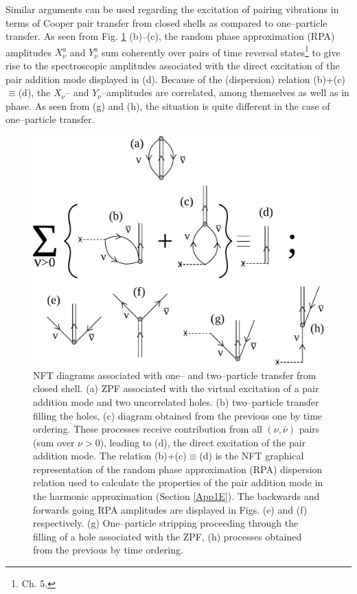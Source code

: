 Similar arguments can be used regarding the excitation of pairing vibrations in terms of Cooper pair transfer from closed shells as compared to one--particle transfer. As seen from Fig. \ref{fig2.1.5} (b)--(c), the random phase approximation (RPA) amplitudes $X_\nu^a$ and $Y^a_\nu$ sum coherently over pairs of time reversal states\footnote{\cite{Brink:05} Ch. 5.} to give rise to the spectroscopic amplitudes associated with the direct excitation of the pair addition mode displayed in (d). Because of the (dispersion) relation (b)+(c)$\equiv$(d), the $X_\nu$-- and $Y_\nu$--amplitudes are correlated, among themselves as well as in phase. As seen from (g) and (h), the situation is quite different in the case of one--particle transfer. 
\begin{figure}[h!]
\centerline {
\includegraphics*[width=12cm]{nutshell/figs/fig2_1_5}
}
\caption{NFT diagrams associated with one-- and two--particle transfer from closed shell. (a) ZPF associated with the virtual excitation of a pair addition mode and two uncorrelated holes. (b) two--particle transfer filling the holes, (c) diagram obtained from the previous one by time ordering. These processes receive contribution from all $(\nu,\bar\nu)$ pairs (sum over $\nu>0$), leading to (d), the direct excitation of the pair addition mode. The relation (b)+(c)$\equiv$(d) is the NFT graphical representation of the random phase approximation (RPA) dispersion relation used to calculate the properties of the pair addition mode in the harmonic approximation (Section \ref{App1E}). The backwards and forwards going RPA amplitudes are displayed in Figs. (e) and (f) respectively. (g) One--particle stripping proceeding through the filling of a hole associated with the ZPF, (h) processes obtained from the previous by time ordering.}
\label{fig2.1.5}
\end{figure}
